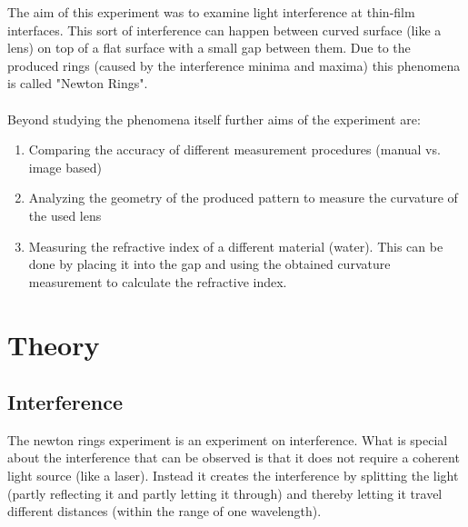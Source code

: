 \documentclass[12pt]{article}
\begin{document}
The aim of this experiment was to examine light interference at thin-film interfaces.
This sort of interference can
happen between curved surface (like a lens) on top of a flat surface with a small gap between them.
Due to the produced rings (caused by the interference minima and maxima) this phenomena
is called "Newton Rings".\\
\\
Beyond studying the phenomena itself further aims of the experiment are:
\begin{enumerate}
  \item Comparing the accuracy of different measurement procedures (manual vs. image based)
  \item Analyzing the geometry of the produced pattern to measure the curvature of the used lens
  \item Measuring the refractive index of a different material (water). This can be done by placing it into the gap and
        using the obtained curvature measurement to calculate the refractive index.
\end{enumerate}

\section{Theory}

\subsection{Interference}

The newton rings experiment is an experiment on interference. What is special about
the interference that can be observed is that it does not require a coherent light
source (like a laser). Instead it creates the interference by splitting the light
(partly reflecting it and partly letting it through) and thereby letting it travel
different distances (within the range of one wavelength).\\
\end{document}
